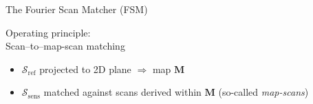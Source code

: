 \begin{frame}[noframenumbering]{The Fourier Scan Matcher (FSM)}


  \begin{center}
    Operating principle: \\
    Scan--to--map-scan matching \\
  \end{center}

  \begin{itemize}
    \item \textcolor{r}{$\mathcal{S}_{\text{ref}}$} projected to 2D plane $\Rightarrow$ map $\bm{M}$
    \item \textcolor{b}{$\mathcal{S}_{\text{sens}}$} matched against scans derived within $\bm{M}$ (so-called \textit{map-scans})
  \end{itemize}

\end{frame}
